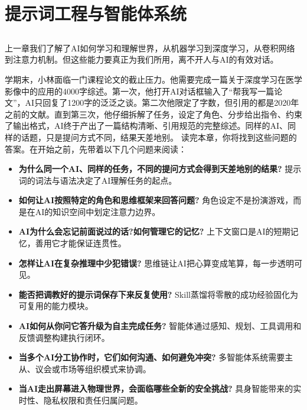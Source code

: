 
\chapter{提示词工程与智能体系统}


\section*{}
上一章我们了解了AI如何学习和理解世界，从机器学习到深度学习，从卷积网络到注意力机制。但这些能力要真正为我们所用，离不开人与AI的有效对话。

学期末，小林面临一门课程论文的截止压力。他需要完成一篇关于深度学习在医学影像中的应用的4000字综述。第一次，他打开AI对话框输入了“帮我写一篇论文”，AI只回复了1200字的泛泛之谈。第二次他限定了字数，但引用的都是2020年之前的文献。直到第三次，他仔细拆解了任务，设定了角色、分步给出指令、约束了输出格式，AI终于产出了一篇结构清晰、引用规范的完整综述。同样的AI、同样的话题，只是提问方式不同，结果天差地别。
读完本章，你将找到这些问题的答案。在开始之前，先带着以下几个问题来阅读：

\begin{itemize}
\item \textbf{为什么同一个AI、同样的任务，不同的提问方式会得到天差地别的结果?} 提示词的词法与语法决定了AI理解任务的起点。
\item \textbf{如何让AI按照特定的角色和思维框架来回答问题?} 角色设定不是扮演游戏，而是在AI的知识空间中划定注意力边界。
\item \textbf{AI为什么会忘记前面说过的话?如何管理它的记忆?} 上下文窗口是AI的短期记忆，善用它才能保证连贯性。
\item \textbf{怎样让AI在复杂推理中少犯错误?} 思维链让AI把心算变成笔算，每一步透明可见。
\item \textbf{能否把调教好的提示词保存下来反复使用?} Skill蒸馏将零散的成功经验固化为可复用的能力模块。
\item \textbf{AI如何从你问它答升级为自主完成任务?} 智能体通过感知、规划、工具调用和反馈调整构建执行闭环。
\item \textbf{当多个AI分工协作时，它们如何沟通、如何避免冲突?} 多智能体系统需要主从、议会或市场等组织模式来协调。
\item \textbf{当AI走出屏幕进入物理世界，会面临哪些全新的安全挑战?} 具身智能带来的实时性、隐私权限和责任归属问题。
\end{itemize}

